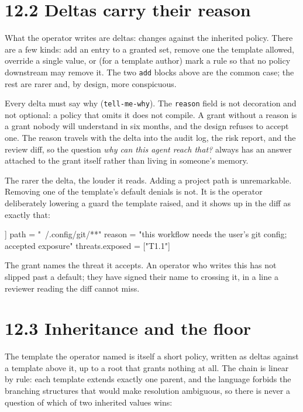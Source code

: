 \hypertarget{deltas-carry-their-reason}{%
\section{12.2 Deltas carry their
reason}\label{deltas-carry-their-reason}}

What the operator writes are deltas: changes against the inherited
policy. There are a few kinds: add an entry to a granted set, remove one
the template allowed, override a single value, or (for a template
author) mark a rule so that no policy downstream may remove it. The two
\texttt{add} blocks above are the common case; the rest are rarer and,
by design, more conspicuous.

Every delta must say why (\texttt{tell-me-why}). The \texttt{reason}
field is not decoration and not optional: a policy that omits it does
not compile. A grant without a reason is a grant nobody will understand
in six months, and the design refuses to accept one. The reason travels
with the delta into the audit log, the risk report, and the review diff,
so the question \emph{why can this agent reach that?} always has an
answer attached to the grant itself rather than living in someone's
memory.

The rarer the delta, the louder it reads. Adding a project path is
unremarkable. Removing one of the template's default denials is not. It
is the operator deliberately lowering a guard the template raised, and
it shows up in the diff as exactly that:

\begin{kennelcode}
[[fs.deny.remove]]
path = "~/.config/git/**"
reason = "this workflow needs the user's git config; accepted exposure"
threats.exposed = ["T1.1"]
\end{kennelcode}

The grant names the threat it accepts. An operator who writes this has
not slipped past a default; they have signed their name to crossing it,
in a line a reviewer reading the diff cannot miss.

\hypertarget{inheritance-and-the-floor}{%
\section{12.3 Inheritance and the
floor}\label{inheritance-and-the-floor}}

The template the operator named is itself a short policy, written as
deltas against a template above it, up to a root that grants nothing at
all. The chain is linear by rule: each template extends exactly one
parent, and the language forbids the branching structures that would
make resolution ambiguous, so there is never a question of which of two
inherited values wins:


